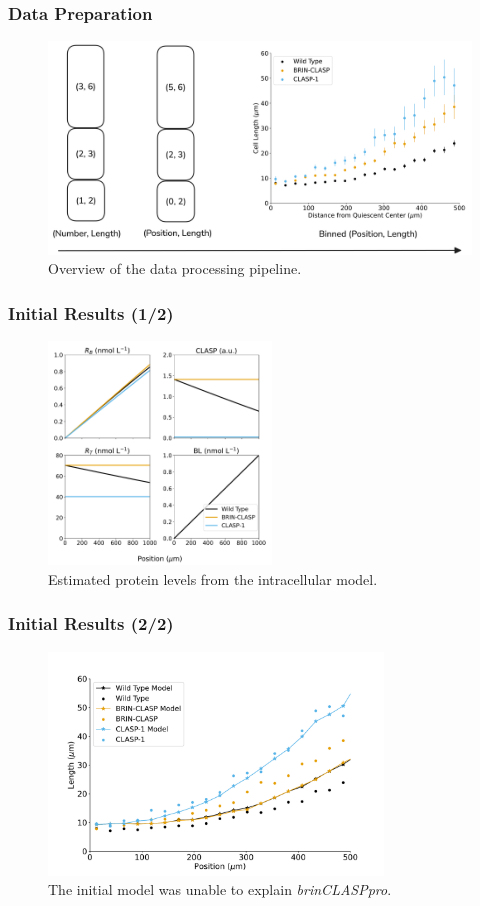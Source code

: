 \documentclass{beamer}
\begin{document}
\begin{frame}
\frametitle{Data Preparation}
\begin{figure}
  \centering
  \includegraphics[width=\textwidth]{data-processing.png}
  \caption{Overview of the data processing pipeline.}
\end{figure}
\end{frame}

\begin{frame}
\frametitle{Initial Results (1/2)}
\begin{figure}
  \centering
  \includegraphics[height=16em]{bes1-mutants.pdf}
  \caption{Estimated protein levels from the intracellular model.}
\end{figure}
\end{frame}

\begin{frame}
\frametitle{Initial Results (2/2)}
\begin{figure}
  \centering
  \includegraphics[height=16em]{column-original-fit.pdf}
  \caption{The initial model was unable to explain \emph{brinCLASPpro}.}
\end{figure}
\end{frame}
\end{document}
